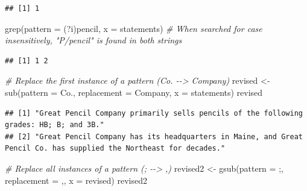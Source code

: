\documentclass[
]{book}
\newenvironment{Shaded}{\begin{snugshade}}{\end{snugshade}}
\newcommand{\AttributeTok}[1]{\textcolor[rgb]{0.77,0.63,0.00}{#1}}
\newcommand{\CommentTok}[1]{\textcolor[rgb]{0.56,0.35,0.01}{\textit{#1}}}
\newcommand{\FunctionTok}[1]{\textcolor[rgb]{0.00,0.00,0.00}{#1}}
\newcommand{\NormalTok}[1]{#1}
\newcommand{\OtherTok}[1]{\textcolor[rgb]{0.56,0.35,0.01}{#1}}
\newcommand{\StringTok}[1]{\textcolor[rgb]{0.31,0.60,0.02}{#1}}
\begin{document}
\begin{verbatim}
## [1] 1
\end{verbatim}

\begin{Shaded}
\begin{Highlighting}[]
\FunctionTok{grep}\NormalTok{(}\AttributeTok{pattern =} \StringTok{\textquotesingle{}(?i)pencil\textquotesingle{}}\NormalTok{, }\AttributeTok{x =}\NormalTok{ statements) }\CommentTok{\# When searched for case insensitively, "P/pencil" is found in both strings}
\end{Highlighting}
\end{Shaded}

\begin{verbatim}
## [1] 1 2
\end{verbatim}

\begin{Shaded}
\begin{Highlighting}[]
\CommentTok{\# Replace the first instance of a pattern (Co. {-}{-}\textgreater{} Company)}
\NormalTok{revised }\OtherTok{\textless{}{-}} \FunctionTok{sub}\NormalTok{(}\AttributeTok{pattern =} \StringTok{\textquotesingle{}Co.\textquotesingle{}}\NormalTok{, }\AttributeTok{replacement =} \StringTok{\textquotesingle{}Company\textquotesingle{}}\NormalTok{, }\AttributeTok{x =}\NormalTok{ statements)}
\NormalTok{revised}
\end{Highlighting}
\end{Shaded}

\begin{verbatim}
## [1] "Great Pencil Company primarily sells pencils of the following grades: HB; B; and 3B."                            
## [2] "Great Pencil Company has its headquarters in Maine, and Great Pencil Co. has supplied the Northeast for decades."
\end{verbatim}

\begin{Shaded}
\begin{Highlighting}[]
\CommentTok{\# Replace all instances of a pattern (; {-}{-}\textgreater{} ,)}
\NormalTok{revised2 }\OtherTok{\textless{}{-}} \FunctionTok{gsub}\NormalTok{(}\AttributeTok{pattern =} \StringTok{\textquotesingle{};\textquotesingle{}}\NormalTok{, }\AttributeTok{replacement =} \StringTok{\textquotesingle{},\textquotesingle{}}\NormalTok{, }\AttributeTok{x =}\NormalTok{ revised)}
\NormalTok{revised2}
\end{Highlighting}
\end{Shaded}
\end{document}
